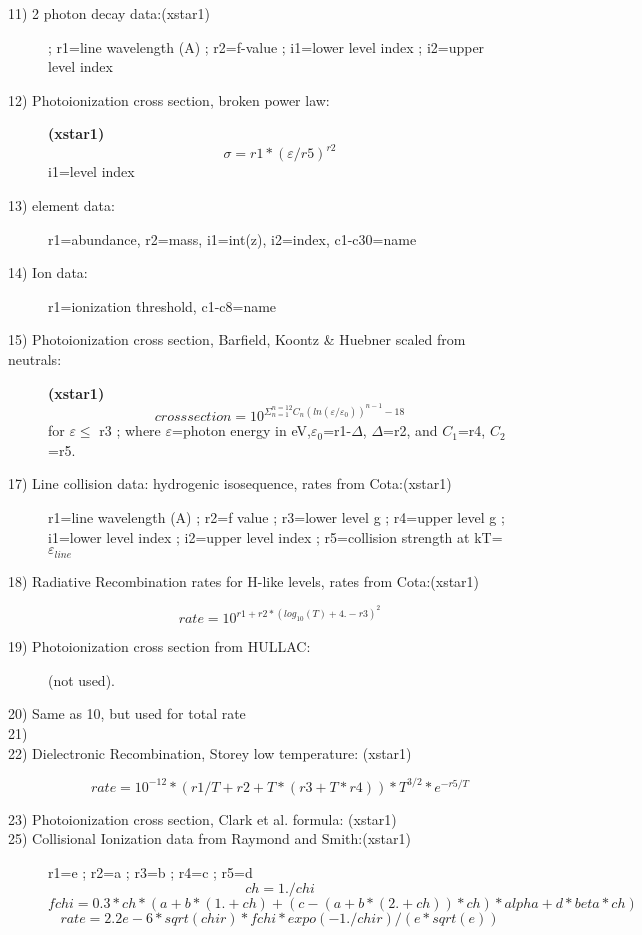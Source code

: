 \begin{description}
\item[11) 2 photon decay data:(xstar1)]
; r1=line wavelength (A)
; r2=f-value
; i1=lower level index
; i2=upper level index

\item[12) Photoionization cross section, broken power law:]
{\bf (xstar1)} 
 $$\sigma=r1*(\varepsilon/r5)^{r2}$$
 i1=level index

\item[13) element data:]
 r1=abundance, r2=mass, i1=int(z), i2=index, c1-c30=name

\item[14) Ion data:]
 r1=ionization threshold, c1-c8=name

\item[15) Photoionization cross section, Barfield, Koontz \& Huebner scaled from 
neutrals:]{\bf (xstar1)}
 $$cross section=10^{\Sigma_{n=1}^{n=12}C_n (ln(\varepsilon/\varepsilon_0))^{n-1}-18}$$
 for $\varepsilon \leq$ r3
; where $\varepsilon$=photon energy in eV,$\varepsilon_0$=r1-$\Delta$,
 $\Delta$=r2, and $C_1$=r4, $C_2$=r5.

\item[17) Line collision data:  hydrogenic isosequence, rates from Cota:(xstar1)]
 r1=line wavelength (A)
; r2=f value
; r3=lower level g
; r4=upper level g
; i1=lower level index
; i2=upper level index
; r5=collision strength at kT= $\varepsilon_{line}$

\item[18) Radiative Recombination rates for H-like levels, rates from Cota:(xstar1)]
 $$rate=10^{r1+r2*(log_{10}(T)+4.-r3)^2}$$

\item[19) Photoionization cross section from HULLAC:]
(not used).
 

\item[20) Same as 10, but used for total rate]                        

\item[ 21)  ]
 

\item[22) Dielectronic Recombination, Storey low temperature: (xstar1)]
 $$rate=10^{-12}*(r1/T+r2+T*(r3+T*r4))*T^{3/2}*e^{-r5/T}$$
 

\item[23) Photoionization cross section, Clark et al. formula: (xstar1)]
 

\item[25) Collisional Ionization data from Raymond and Smith:(xstar1)]
 r1=e
; r2=a
; r3=b
; r4=c
; r5=d
 $$ch = 1./chi$$
 $$fchi = 0.3*ch*(a+b*(1.+ch)+(c-(a+b*(2.+ch))*ch)*alpha+d*beta*ch)$$
 $$rate = 2.2e-6*sqrt(chir)*fchi*expo(-1./chir)/(e*sqrt(e))$$


\end{description}
